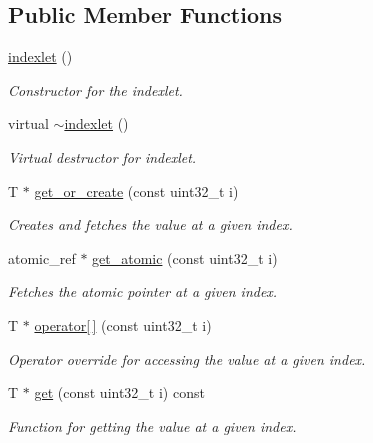 \subsection*{Public Member Functions}
\begin{DoxyCompactItemize}
\item 
\hyperlink{classdialog_1_1index_1_1indexlet_ab1bb4556decdfc358090e73a078e45d2}{indexlet} ()
\begin{DoxyCompactList}\small\item\em Constructor for the indexlet. \end{DoxyCompactList}\item 
virtual \hyperlink{classdialog_1_1index_1_1indexlet_afada63e2f9ead60d701688a06c2fcd81}{$\sim$indexlet} ()
\begin{DoxyCompactList}\small\item\em Virtual destructor for indexlet. \end{DoxyCompactList}\item 
T $\ast$ \hyperlink{classdialog_1_1index_1_1indexlet_aac4ccc3e9c4aa70bfebac6f8b48de7eb}{get\+\_\+or\+\_\+create} (const uint32\+\_\+t i)
\begin{DoxyCompactList}\small\item\em Creates and fetches the value at a given index. \end{DoxyCompactList}\item 
atomic\+\_\+ref $\ast$ \hyperlink{classdialog_1_1index_1_1indexlet_ab3d280e9176781621a9b9c627c7db0e6}{get\+\_\+atomic} (const uint32\+\_\+t i)
\begin{DoxyCompactList}\small\item\em Fetches the atomic pointer at a given index. \end{DoxyCompactList}\item 
T $\ast$ \hyperlink{classdialog_1_1index_1_1indexlet_a879de6014445e5fdd8091a8f20ced31a}{operator\mbox{[}$\,$\mbox{]}} (const uint32\+\_\+t i)
\begin{DoxyCompactList}\small\item\em Operator override for accessing the value at a given index. \end{DoxyCompactList}\item 
T $\ast$ \hyperlink{classdialog_1_1index_1_1indexlet_a06b8f0bb16c6ffc2ab1c13404d099298}{get} (const uint32\+\_\+t i) const
\begin{DoxyCompactList}\small\item\em Function for getting the value at a given index. \end{DoxyCompactList}\item 

\end{DoxyCompactItemize}
